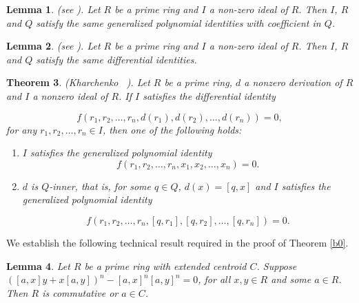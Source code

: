 \documentclass[12pt]{amsart}
\newtheorem{thm}{Theorem}[section]
\newtheorem{lem}[thm]{Lemma}
\theoremstyle{definition}
\theoremstyle{remark}
\begin{document}
\begin{lem}\label{b1}
\emph{(see \cite[Theorem 2]{a1})}.
 Let $R$ be a prime ring and $I$ a non-zero ideal of $R$.
 Then $I$, $R$ and $Q$ satisfy the same generalized
 polynomial identities with coefficient in $Q$.
 \end{lem}
 \begin{lem}\label{b2}
 \emph{(see \cite[Theorem 2]{a4})}.
 Let $R$ be a prime ring and $I$ a non-zero ideal of $R$.
 Then $I$, $R$ and $Q$ satisfy the same differential
 identities.
\end{lem}
 \begin{thm}\label{b3}
 \emph{(Kharchenko ~\cite{a3})}.
 Let $R$ be a prime ring, $d$
 a nonzero derivation of $R$ and $I$ a nonzero ideal of $R$.
 If $I$ satisfies the differential identity

 \noindent
 $$f(r_{1},r_{2},\ldots,r_{n},d(r_{1}),d(r_{2}),\ldots,d(r_{n})) = 0,$$
 for any $r_{1},r_{2},\ldots,r_{n}\in I$, then one of the following holds:

 \noindent
\begin{enumerate}[label=(\roman{*})]
   \item  $I$ satisfies the generalized polynomial identity
   $$f(r_{1},r_{2},\ldots,r_{n},x_{1},x_{2},\ldots,x_{n}) = 0.$$

   \item $d$ is $Q$-inner, that is, for some $q\in Q$,
   $d(x) = [q,x]$ and $I$ satisfies the generalized polynomial identity

  \noindent
  $$f(r_{1},r_{2},\ldots,r_{n},[q,r_{1}],[q,r_{2}],\ldots,[q,r_{n}]) = 0.$$
  \end{enumerate}
  \end{thm}

 \noindent
 We establish the following technical result required
 in the proof of Theorem \ref{b0}.
\begin{lem}\label{b4}
 Let $R$ be a prime ring with extended centroid $C$.
 Suppose $([a,x]y+x[a,y])^n-[a,x]^n[a,y]^n=0$, for all $x,y \in R$
 and some $a\in R$. Then $R$ is commutative or $a\in C$.
 \end{lem}
 
\end{document}
